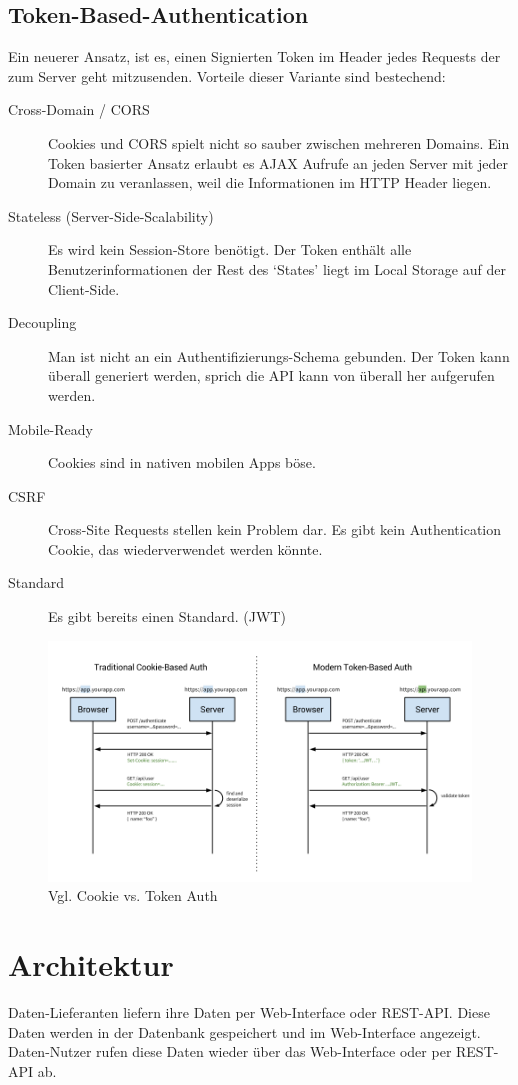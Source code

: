 \subsection{Token-Based-Authentication}
Ein neuerer Ansatz, ist es, einen Signierten Token im Header jedes Requests der zum Server geht mitzusenden. Vorteile dieser Variante sind bestechend:
\begin{description}
  \item[Cross-Domain / CORS]
  Cookies und CORS spielt nicht so sauber zwischen mehreren Domains. Ein Token basierter Ansatz erlaubt es AJAX Aufrufe an jeden Server mit jeder Domain zu veranlassen, weil die Informationen im HTTP Header liegen.
  \item[Stateless (Server-Side-Scalability)]Es wird kein Session-Store benötigt. Der Token enthält alle Benutzerinformationen der Rest des `States' liegt im Local Storage auf der Client-Side.
  \item[Decoupling] Man ist nicht an ein Authentifizierungs-Schema gebunden. Der Token kann überall generiert werden, sprich die API kann von überall her aufgerufen werden.
  \item[Mobile-Ready]Cookies sind in nativen mobilen Apps böse.
  \item[CSRF]Cross-Site Requests stellen kein Problem dar. Es gibt kein Authentication Cookie, das wiederverwendet werden könnte.
  \item[Standard]Es gibt bereits einen Standard. (\gls{JWT})
\end{description}
\begin{figure}[H]
    \centering
    \includegraphics[width=\linewidth]{fig/cookie-token-auth}
    \caption{Vgl. Cookie vs. Token Auth}
    \label{fig:pd:cookie-token-auth}
\end{figure}
\section{Architektur}
\xxx
Daten-Lieferanten liefern ihre Daten per Web-Interface oder REST-API. Diese Daten werden in der Datenbank gespeichert und im Web-Interface angezeigt. Daten-Nutzer rufen diese Daten wieder über das Web-Interface oder per REST-API ab. 

